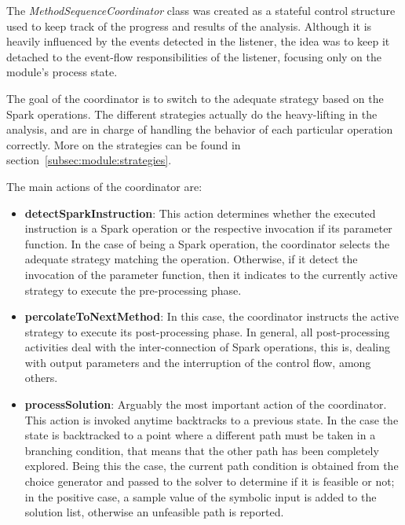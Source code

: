 
The \textit{MethodSequenceCoordinator} class was created as a stateful control structure used to keep track of the progress and results of the analysis. Although it is heavily influenced by the events detected in the listener, the idea was to keep it detached to the event-flow responsibilities of the listener, focusing only on the module's process state.

The goal of the coordinator is to switch to the adequate strategy based on the Spark operations. The different strategies actually do the heavy-lifting in the analysis, and are in charge of handling the behavior of each particular operation correctly. More on the strategies can be found in section~\ref{subsec:module:strategies}.

The main actions of the coordinator are:

\begin{itemize}
	\item \textbf{detectSparkInstruction}: This action determines whether the executed instruction is a Spark operation or the respective invocation if its parameter function. In the case of being a Spark operation, the coordinator selects the adequate strategy matching the operation. Otherwise, if it detect the invocation of the parameter function, then it indicates to the currently active strategy to execute the pre-processing phase.
	\item \textbf{percolateToNextMethod}: In this case, the coordinator instructs the active strategy to execute its post-processing phase. In general, all post-processing activities deal with the inter-connection of Spark operations, this is, dealing with output parameters and the interruption of the control flow, among others.
	\item \textbf{processSolution}: Arguably the most important action of the coordinator. This action is invoked anytime \jpf{} backtracks to a previous state. In the case the state is backtracked to a point where a different path must be taken in a branching condition, that means that the other path has been completely explored. Being this the case, the current path condition is obtained from the choice generator and passed to the solver to determine if it is feasible or not; in the positive case, a sample value of the symbolic input is added to the solution list, otherwise an unfeasible path is reported.
\end{itemize}

